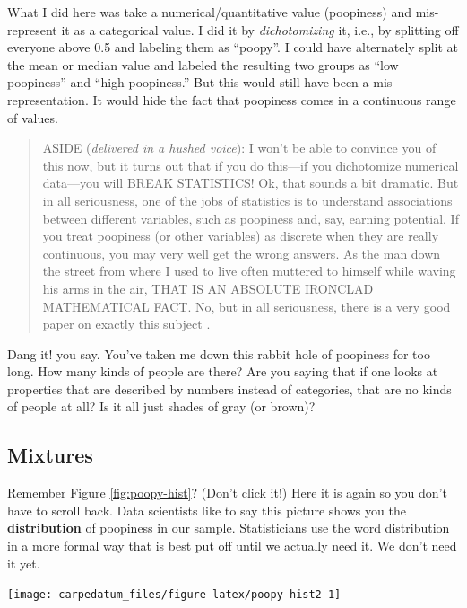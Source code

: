 \documentclass[openany]{book}
\begin{document}
What I did here was take a numerical/quantitative value (poopiness) and mis-represent it as a categorical value. I did it by \emph{dichotomizing} it, i.e., by splitting off everyone above 0.5 and labeling them as ``poopy''. I could have alternately split at the mean or median value and labeled the resulting two groups as ``low poopiness'' and ``high poopiness.'' But this would still have been a mis-representation. It would hide the fact that poopiness comes in a continuous range of values.

\begin{quote}
ASIDE (\emph{delivered in a hushed voice}): I won't be able to convince you of this now, but it turns out that if you do this---if you dichotomize numerical data---you will BREAK STATISTICS! Ok, that sounds a bit dramatic. But in all seriousness, one of the jobs of statistics is to understand associations between different variables, such as poopiness and, say, earning potential. If you treat poopiness (or other variables) as discrete when they are really continuous, you may very well get the wrong answers. As the man down the street from where I used to live often muttered to himself while waving his arms in the air, THAT IS AN ABSOLUTE IRONCLAD MATHEMATICAL FACT. No, but in all seriousness, there is a very good paper on exactly this subject \citep{maccallum2002}.
\end{quote}

Dang it! you say. You've taken me down this rabbit hole of poopiness for too long. How many kinds of people are there? Are you saying that if one looks at properties that are described by numbers instead of categories, that are no kinds of people at all? Is it all just shades of gray (or brown)?

\hypertarget{mixtures}{%
\subsection*{Mixtures}\label{mixtures}}

Remember Figure \ref{fig:poopy-hist}? (Don't click it!) Here it is again so you don't have to scroll back. Data scientists like to say this picture shows you the \textbf{distribution} of poopiness in our sample. Statisticians use the word distribution in a more formal way that is best put off until we actually need it. We don't need it yet.

\begin{center}\texttt{[image: carpedatum\_files/figure-latex/poopy-hist2-1]} \end{center}
\end{document}
